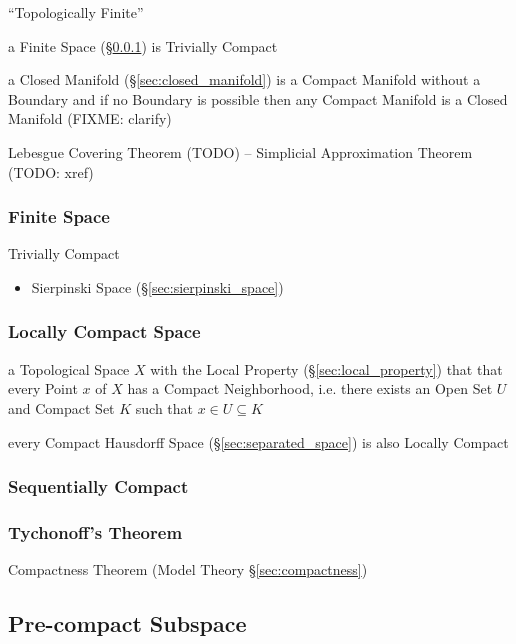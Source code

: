 ``Topologically Finite''

a Finite Space (\S\ref{sec:finite_space}) is Trivially Compact

\fist a Closed Manifold (\S\ref{sec:closed_manifold}) is a Compact Manifold
without a Boundary and if no Boundary is possible then any Compact Manifold
is a Closed Manifold (FIXME: clarify)

Lebesgue Covering Theorem (TODO) -- Simplicial Approximation Theorem (TODO:
xref)



\subsubsection{Finite Space}\label{sec:finite_space}

Trivially Compact

\begin{itemize}
  \item Sierpinski Space (\S\ref{sec:sierpinski_space})
\end{itemize}



\subsubsection{Locally Compact Space}\label{sec:locally_compact}

a Topological Space $X$ with the Local Property (\S\ref{sec:local_property})
that that every Point $x$ of $X$ has a Compact Neighborhood, i.e. there exists
an Open Set $U$ and Compact Set $K$ such that $x \in U \subseteq K$

every Compact Hausdorff Space (\S\ref{sec:separated_space}) is also Locally
Compact



\subsubsection{Sequentially Compact}\label{sec:sequentially_compact}

\subsubsection{Tychonoff's Theorem}\label{sec:tychonoffs_theorem}

Compactness Theorem (Model Theory \S\ref{sec:compactness})



\subsection{Pre-compact Subspace}\label{sec:precompact}


